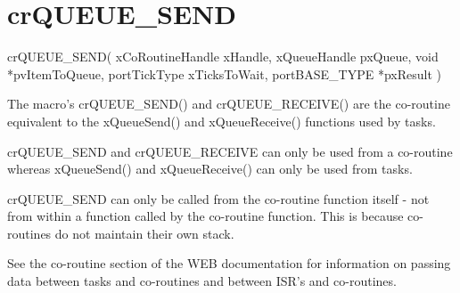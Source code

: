 \hypertarget{group__cr_q_u_e_u_e___s_e_n_d}{\section{cr\-Q\-U\-E\-U\-E\-\_\-\-S\-E\-N\-D}
\label{group__cr_q_u_e_u_e___s_e_n_d}
}

\begin{DoxyPre}
 crQUEUE\_SEND(
                  xCoRoutineHandle xHandle,
                  xQueueHandle pxQueue,
                  void *pvItemToQueue,
                  portTickType xTicksToWait,
                  portBASE\_TYPE *pxResult
             )\end{DoxyPre}


The macro's cr\-Q\-U\-E\-U\-E\-\_\-\-S\-E\-N\-D() and cr\-Q\-U\-E\-U\-E\-\_\-\-R\-E\-C\-E\-I\-V\-E() are the co-\/routine equivalent to the x\-Queue\-Send() and x\-Queue\-Receive() functions used by tasks.

cr\-Q\-U\-E\-U\-E\-\_\-\-S\-E\-N\-D and cr\-Q\-U\-E\-U\-E\-\_\-\-R\-E\-C\-E\-I\-V\-E can only be used from a co-\/routine whereas x\-Queue\-Send() and x\-Queue\-Receive() can only be used from tasks.

cr\-Q\-U\-E\-U\-E\-\_\-\-S\-E\-N\-D can only be called from the co-\/routine function itself -\/ not from within a function called by the co-\/routine function. This is because co-\/routines do not maintain their own stack.

See the co-\/routine section of the W\-E\-B documentation for information on passing data between tasks and co-\/routines and between I\-S\-R's and co-\/routines.


